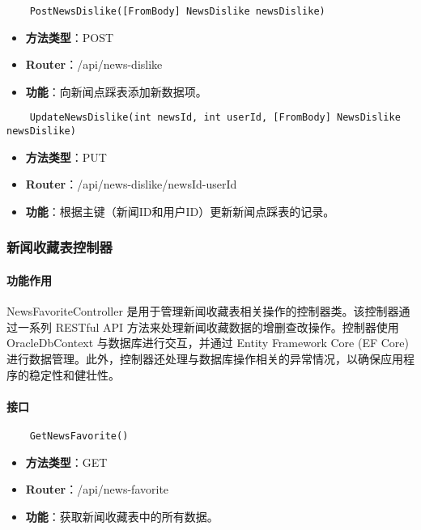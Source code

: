 \begin{verbatim}
	PostNewsDislike([FromBody] NewsDislike newsDislike)
\end{verbatim}

\begin{itemize}
	\item \textbf{方法类型}：POST
	\item \textbf{Router}：/api/news-dislike
	\item \textbf{功能}：向新闻点踩表添加新数据项。
\end{itemize}

\begin{verbatim}
	UpdateNewsDislike(int newsId, int userId, [FromBody] NewsDislike newsDislike)
\end{verbatim}

\begin{itemize}
	\item \textbf{方法类型}：PUT
	\item \textbf{Router}：/api/news-dislike/{newsId}-{userId}
	\item \textbf{功能}：根据主键（新闻ID和用户ID）更新新闻点踩表的记录。
\end{itemize}

\subsubsection{新闻收藏表控制器}

\paragraph{功能作用}

NewsFavoriteController 是用于管理新闻收藏表相关操作的控制器类。该控制器通过一系列 RESTful API 方法来处理新闻收藏数据的增删查改操作。控制器使用 OracleDbContext 与数据库进行交互，并通过 Entity Framework Core (EF Core) 进行数据管理。此外，控制器还处理与数据库操作相关的异常情况，以确保应用程序的稳定性和健壮性。

\paragraph{接口}

\begin{verbatim}
	GetNewsFavorite()
\end{verbatim}

\begin{itemize}
	\item \textbf{方法类型}：GET
	\item \textbf{Router}：/api/news-favorite
	\item \textbf{功能}：获取新闻收藏表中的所有数据。
\end{itemize}

